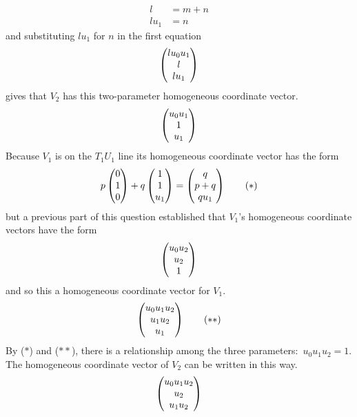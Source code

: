 \begin{exercises}
\begin{answer}
\begin{exparts}
\begin{equation*}
\begin{aligned}
              l    &= m+n    \\
              lu_1 &= n
            \end{aligned}
           \end{equation*}
           and substituting $lu_1$ for $n$ in the first equation 
           \begin{equation*}
             \begin{pmatrix} lu_0u_1 \\ l \\ lu_1 \end{pmatrix}
           \end{equation*}
           gives that 
           $V_2$ has this two-parameter homogeneous coordinate vector.
           \begin{equation*}
             \begin{pmatrix} u_0u_1 \\ 1 \\ u_1 \end{pmatrix}
           \end{equation*}
        \partsitem
           Because $V_1$ is on the $T_1U_1$ line its
           homogeneous coordinate vector has the form
           \begin{equation*}
             p\begin{pmatrix} 0 \\ 1 \\ 0 \end{pmatrix}+q\begin{pmatrix} 1 \\ 1 \\ u_1 \end{pmatrix}
             =\begin{pmatrix} q \\ p+q \\ qu_1 \end{pmatrix}
           \tag*{($*$)}\end{equation*}
           but a previous part of this question established that $V_1$'s
           homogeneous coordinate vectors have the form
           \begin{equation*}
            \begin{pmatrix} u_0u_2 \\ u_2 \\ 1 \end{pmatrix}             
           \end{equation*}
           and so this a homogeneous coordinate vector for $V_1$.
           \begin{equation*}
             \begin{pmatrix} u_0u_1u_2 \\ u_1u_2 \\ u_1 \end{pmatrix}             
           \tag*{($**$)}\end{equation*}
           By ($*$) and ($**$), there is a 
           relationship among the three parameters:~$u_0u_1u_2=1$.
         \partsitem  
           The homogeneous coordinate vector of $V_2$ can be written
           in this way.
           \begin{equation*}
             \colvec{u_0u_1u_2 \\ u_2 \\ u_1u_2}

\end{equation*}
\end{exparts}
\end{answer}
\end{exercises}
